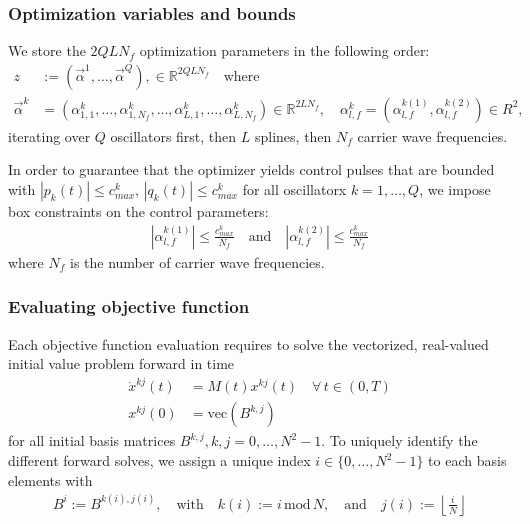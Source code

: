 \documentclass[letterpaper]{article}
\newcommand{\R}{\mathds{R}}
\begin{document}
  \subsubsection{Optimization variables and bounds}
  We store the $2QLN_f$ optimization parameters in the following order:
  \begin{align}
    z &:= \left( \vec{\alpha}^1, \dots, \vec{\alpha}^Q \right), \in \mathds{R}^{2QLN_f} \quad \text{where}\\
    \vec{\alpha}^k &= \left( \alpha_{1,1}^k,\dots, \alpha_{1,N_f}^k, \dots, \alpha_{L,1}^{k}, \dots, \alpha_{L,N_f}^k \right) \in \R^{2LN_f}, \quad \alpha_{l,f}^k = \left(\alpha_{l,f}^{k(1)}, \alpha_{l,f}^{k(2)} \right) \in R^2,
  \end{align}
  iterating over $Q$ oscillators first, then $L$ splines, then $N_f$ carrier wave frequencies. 

  In order to guarantee that the optimizer yields control pulses that are bounded with $|p_k(t)| \leq c^k_{max}$, $|q_k(t)| \leq c^k_{max}$ for all oscillatorx $k=1,\dots, Q$, we impose box constraints on the control parameters:
   \begin{align}
     | \alpha_{l,f}^{k(1)}| \leq \frac{c^k_{max}}{N_f} \quad \text{and} \quad | \alpha_{l,f}^{k(2)} | \leq \frac{c^k_{max}}{N_f}
   \end{align}
   where $N_f$ is the number of carrier wave frequencies.



  \subsubsection{Evaluating objective function}
    Each objective function evaluation requires to solve the vectorized, real-valued initial value problem forward in time
    \begin{align*}
      \dot x^{kj}(t) &= M(t) x^{kj}(t) \quad \forall \, t\in (0,T) \\
      x^{kj}(0) &= \mbox{vec}(B^{k,j})
    \end{align*}
    for all initial basis matrices $B^{k,j}, k,j=0,\dots,N^2-1$. To uniquely identify the different forward solves, we assign a unique index $i \in \{0,\dots, N^2-1\}$ to each basis elements with 
    \begin{align*}
      B^i := B^{k(i), j(i)}, \quad \text{with} \quad k(i) := i \,\mbox{mod}\, N, \quad \text{and} \quad j(i) := \left\lfloor \frac{i}{N} \right\rfloor
    \end{align*}
\end{document}
